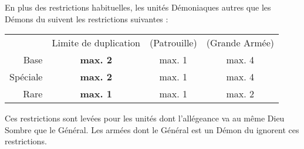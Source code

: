 \newcommand{\brasscannonrule}{%
Ne peut être pris que si le Général est un Démon du \wrath{}.

\vspace*{5pt}
\textbf{\artilleryweapon} de type \textbf{\cannon{} (\distance{1D6})}.\newline
\range{48}, \Strength{} 10, \flamingattacks{}, \multiplewounds{\ordnance}{}, \armourpiercing{2}.

\vspace*{5pt}
Si le \bloodchariot{} ne fait que des Pivots et n'effectue aucun mouvement supplémentaire, il ne souffre pas de la pénalité pour bouger et tirer.
}

\newcommand{\bloodfeastrule}{%
À chaque fois que cette figurine réussit une charge, tous les Démons du \wrath{} engagés dans le même combat qu'elle gagnent la règle \frenzy{} jusqu'à la fin de la Phase de Corps à Corps.
}

\newcommand{\firstnote}{1}
\newcommand{\secondnote}{2}
\newcommand{\QRSnote}{%
\noindent$^{\firstnote}$ Un membre d'équipage de moins quand il sert de monture.

\noindent$^{\secondnote}$ Pas d'\igniter{} quand il sert de monture.
}












\startarmywiderules

\spaceaftersection{}

En plus des restrictions habituelles, les unités Démoniaques autres que les Démons du \truechaos{} suivent les restrictions suivantes :

\vspace*{0.2cm}
\renewcommand{\arraystretch}{2}
\begin{center}\begin{tabular}{rccc}
\hline
 & Limite de duplication & (Patrouille) & (Grande Armée) \tabularnewline
 Base & \textbf{max. 2} & max. 1 & max. 4 \tabularnewline
 Spéciale & \textbf{max. 2} & max. 1 & max. 4 \tabularnewline
 Rare & \textbf{max. 1} & max. 1 & max. 2 \tabularnewline
\hline
\end{tabular}\end{center}
\renewcommand{\arraystretch}{1.2}
\vspace*{0.2cm}

Ces restrictions sont levées pour les unités dont l'allégeance va au même Dieu Sombre que le Général. Les armées dont le Général est un Démon du \truechaos{} ignorent ces restrictions.

